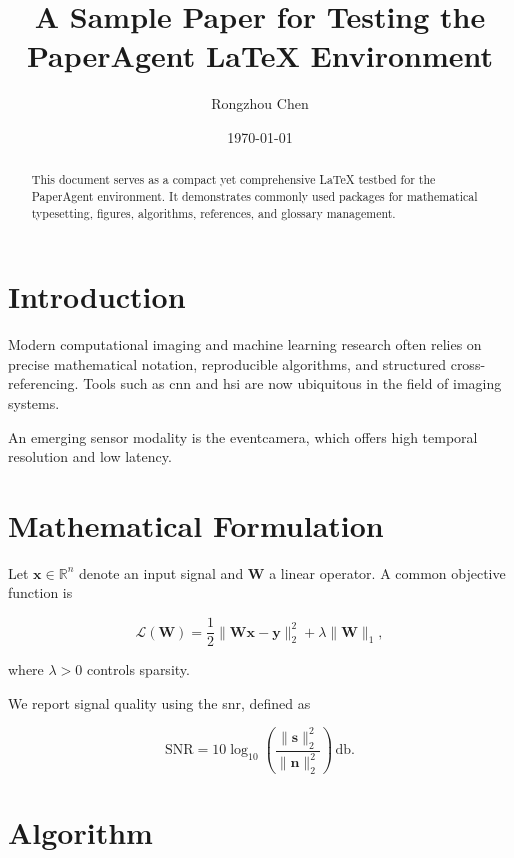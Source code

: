 \documentclass[11pt,a4paper]{article}
\title{\textbf{A Sample Paper for Testing the PaperAgent LaTeX Environment}}
\author{Rongzhou Chen}
\date{\today}
\begin{document}
\maketitle

\begin{abstract}
This document serves as a compact yet comprehensive \LaTeX{} testbed for the
PaperAgent environment. It demonstrates commonly used packages for mathematical
typesetting, figures, algorithms, references, and glossary management.
\end{abstract}

\section{Introduction}

Modern computational imaging and machine learning research often relies on
precise mathematical notation, reproducible algorithms, and structured
cross-referencing. Tools such as \gls{cnn} and \gls{hsi} are now ubiquitous in
the field of imaging systems.

An emerging sensor modality is the \gls{eventcamera}, which offers high temporal
resolution and low latency.

\section{Mathematical Formulation}

Let $\bm{x} \in \mathbb{R}^n$ denote an input signal and $\bm{W}$ a linear operator.
A common objective function is

\begin{equation}
\label{eq:loss}
\mathcal{L}(\bm{W}) =
\frac{1}{2} \lVert \bm{W}\bm{x} - \bm{y} \rVert_2^2
+ \lambda \lVert \bm{W} \rVert_1 ,
\end{equation}

where $\lambda > 0$ controls sparsity.

We report signal quality using the \gls{snr}, defined as

\begin{equation}
\mathrm{SNR} = 10 \log_{10} \left(
\frac{\lVert \bm{s} \rVert_2^2}{\lVert \bm{n} \rVert_2^2}
\right) \, \si{\decibel}.
\end{equation}

\section{Algorithm}
\end{document}
